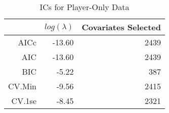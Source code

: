 \begin{table}[ht]
\centering
\begin{tabular}{rrr}
  \hline
 & $log(\lambda)$ & Covariates Selected \\ 
  \hline
AICc & -13.60 & 2439 \\ 
  AIC & -13.60 & 2439 \\ 
  BIC & -5.22 & 387 \\ 
  CV.Min & -9.56 & 2415 \\ 
  CV.1se & -8.45 & 2321 \\ 
   \hline
\end{tabular}
\caption{ICs for Player-Only Data} 
\label{tab:pl_ic}
\end{table}
